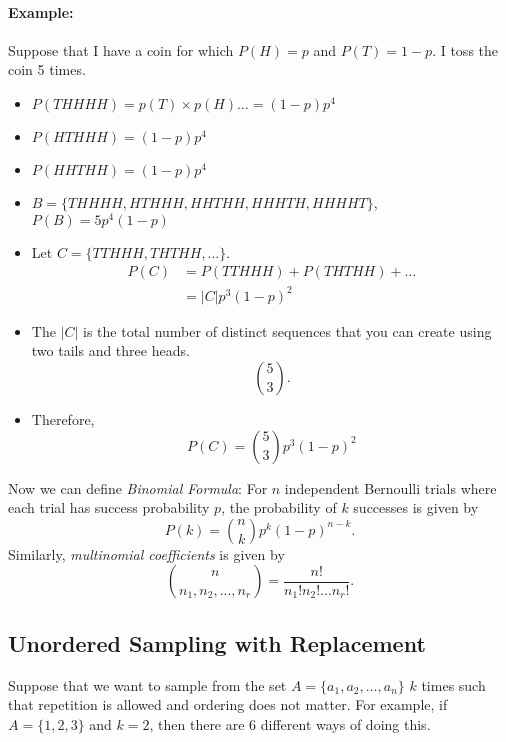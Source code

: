 \paragraph{Example: }Suppose that I have a coin for which $P(H)=p$ and $P(T)=1-p$. I toss the coin 5 times. 
\begin{itemize}
	\item $P(THHHH) = p(T)\times p(H)\dots = (1-p)p^4$
	\item $P(HTHHH) = (1-p)p^4$
	\item $P(HHTHH) = (1-p)p^4$
	\item $B=\{THHHH, HTHHH, HHTHH, HHHTH, HHHHT\}$, $P(B) = 5p^4(1-p)$
	\item Let $C=\{TTHHH, THTHH,\dots\}$.
		\begin{align*}
			P(C) &= P(TTHHH)+P(THTHH)+\dots\\
				 &= |C|p^3(1-p)^2
		\end{align*}
	\item The $|C|$ is the total number of distinct sequences that you can create using two tails and three heads.
		$$\binom{5}{3}.$$
	\item Therefore, 
		$$P(C) = \binom{5}{3}p^3(1-p)^2$$
\end{itemize}
Now we can define \textit{Binomial Formula}: For $n$ independent Bernoulli trials where each trial has success probability $p$, the probability of $k$ successes is given by 
$$P(k) = \binom{n}{k}p^k(1-p)^{n-k}.$$
Similarly, \textit{multinomial coefficients} is given by
$${n \choose n_1,n_2,...,n_r}=\frac{n!}{n_1! n_2! ... n_r!}.$$

\subsection{Unordered Sampling with Replacement}
Suppose that we want to sample from the set $A=\{a_1,a_2,\dots,a_n\}$ $k$ times such that repetition is allowed and ordering does not matter. For example, if $A=\{1,2,3\}$ and $k=2$, then there are 6 different ways of doing this.

